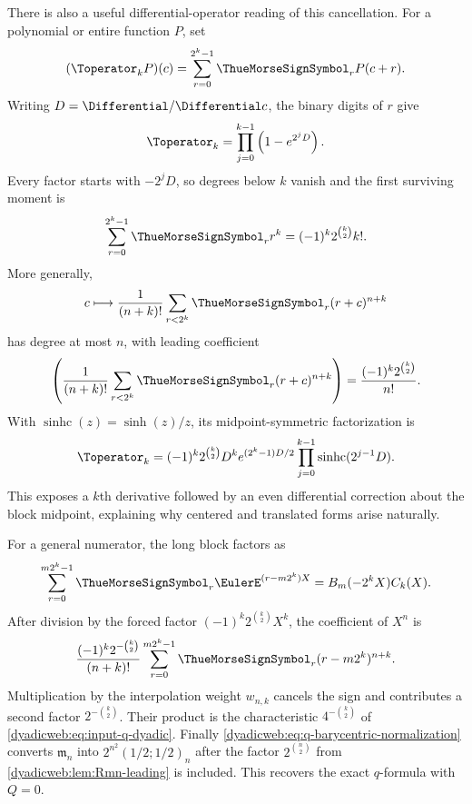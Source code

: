 \documentclass[11pt,oneside]{article}
\theoremstyle{definition}
\theoremstyle{remark}
\begin{document}
There is also a useful differential-operator reading of this cancellation.  For a polynomial
or entire function $P$, set
\begin{equation}
 (\Toperator_kP)(c)=\sum_{r=0}^{2^k-1}\ThueMorseSignSymbol_rP(c+r).         \label{dyadicq:eq:TM-operator}
\end{equation}
Writing $D=\Differential/\Differential c$, the binary digits of $r$ give
\begin{equation}
 \Toperator_k=\prod_{j=0}^{k-1}\left(1-e^{2^jD}\right). \label{dyadicq:eq:TM-factorization}
\end{equation}
Every factor starts with $-2^jD$, so degrees below $k$ vanish and the first surviving
moment is
\begin{equation}
 \sum_{r=0}^{2^k-1}\ThueMorseSignSymbol_rr^k=(-1)^k2^{\binom k2}k!.       \label{dyadicq:eq:first-TM-moment}
\end{equation}
More generally,
\begin{equation}
 c\longmapsto\frac1{(n+k)!}\sum_{r<2^k}\ThueMorseSignSymbol_r(r+c)^{n+k} \label{dyadicq:eq:TM-degree-n}
\end{equation}
has degree at most $n$, with leading coefficient
\begin{equation}
 [c^n]\left(\frac1{(n+k)!}\sum_{r<2^k}\ThueMorseSignSymbol_r(r+c)^{n+k}\right)
 =\frac{(-1)^k2^{\binom k2}}{n!}.                         \label{dyadicq:eq:TM-leading-coeff}
\end{equation}
With $\operatorname{sinhc}(z)=\sinh(z)/z$, its midpoint-symmetric factorization is
\begin{equation}
 \Toperator_k=(-1)^k2^{\binom k2}D^k e^{(2^k-1)D/2}
 \prod_{j=0}^{k-1}\operatorname{sinhc}(2^{j-1}D).        \label{dyadicq:eq:TM-sinhc}
\end{equation}
This exposes a $k$th derivative followed by an even differential correction about the
block midpoint, explaining why centered and translated forms arise naturally.

For a general numerator, the long block factors as
\begin{equation}
 \sum_{r=0}^{m2^k-1}\ThueMorseSignSymbol_r\EulerE^{(r-m2^k)X}
 =B_m(-2^kX)C_k(X).                                       \label{dyadicweb:eq:long-block-local}
\end{equation}
After division by the forced factor
$(-1)^k2^{\binom k2}X^k$, the coefficient of $X^n$ is
\begin{equation}
 \frac{(-1)^k2^{-\binom k2}}{(n+k)!}
 \sum_{r=0}^{m2^k-1}\ThueMorseSignSymbol_r(r-m2^k)^{n+k}.                 \label{dyadicweb:eq:node-value-power-sum}
\end{equation}
Multiplication by the interpolation weight $w_{n,k}$ cancels the sign and contributes a
second factor $2^{-\binom k2}$.  Their product is the characteristic
$4^{-\binom k2}$ of \eqref{dyadicweb:eq:input-q-dyadic}.  Finally
\eqref{dyadicweb:eq:q-barycentric-normalization} converts $\mathfrak m_n$ into
$2^{n^2}(1/2;1/2)_n$ after the factor $2^{\binom n2}$ from
\cref{dyadicweb:lem:Rmn-leading} is included.  This recovers the exact $q$-formula with $Q=0$.
\end{document}
